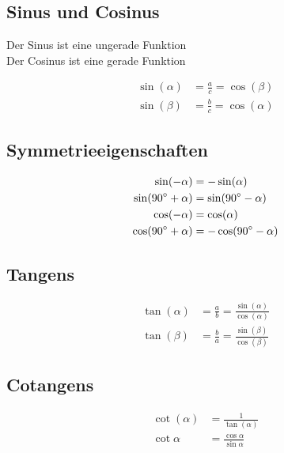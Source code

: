 


	\subsection{Sinus und Cosinus}
		Der Sinus ist eine ungerade Funktion \\
		Der Cosinus ist eine gerade Funktion
		\begin{emphbox}
			\begin{align*}
				\sin(\alpha) &= \frac{a}{c} = \cos(\beta) \\
				\sin(\beta) &= \frac{b}{c} = \cos(\alpha)
			\end{align*}
		\end{emphbox}

	\subsection{Symmetrieeigenschaften}
		\begin{emphbox}
			\begin{align*}
			\sin (-\alpha) &= -\sin(\alpha) \\
			\sin (90 \degree + \alpha) &= \sin (90 \degree - \alpha) \\
			\cos (-\alpha) &= \cos(\alpha)\\
			\cos (90 \degree + \alpha) &= -\cos (90 \degree - \alpha)
			\end{align*}
		\end{emphbox}


	\subsection{Tangens}
		\begin{emphbox}
			\begin{align*}
			\tan(\alpha) &= \frac{a}{b} = \frac{\sin(\alpha)}{\cos(\alpha)} \\
			\tan(\beta) &= \frac{b}{a} = \frac{\sin(\beta)}{\cos(\beta)}
			\end{align*}
		\end{emphbox}
		
	\subsection{Cotangens}
		\begin{emphbox}
			\begin{align*}
			\cot(\alpha) &= \frac{1}{\tan(\alpha)} \\
			\cot \alpha &= \frac{\cos \alpha}{\sin \alpha} 		
			\end{align*}
		\end{emphbox}


